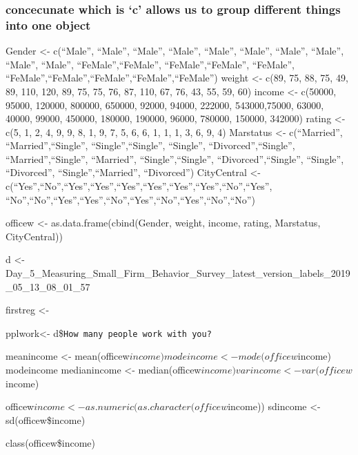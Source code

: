 \documentclass[
]{article}
\begin{document}
\hypertarget{concecunate-which-is-c-allows-us-to-group-different-things-into-one-object}{%
\subsubsection{concecunate which is `c' allows us to group different
things into one
object}\label{concecunate-which-is-c-allows-us-to-group-different-things-into-one-object}}

Gender \textless- c(``Male'', ``Male'', ``Male'', ``Male'', ``Male'',
``Male'', ``Male'', ``Male'', ``Male'', ``Male'', ``FeMale'',``FeMale'',
``FeMale'',``FeMale'', ``FeMale'',
``FeMale'',``FeMale'',``FeMale'',``FeMale'',``FeMale'') weight
\textless- c(89, 75, 88, 75, 49, 89, 110, 120, 89, 75, 75, 76, 87, 110,
67, 76, 43, 55, 59, 60) income \textless- c(50000, 95000, 120000,
800000, 650000, 92000, 94000, 222000, 543000,75000, 63000, 40000, 99000,
450000, 180000, 190000, 96000, 780000, 150000, 342000) rating \textless-
c(5, 1, 2, 4, 9, 9, 8, 1, 9, 7, 5, 6, 6, 1, 1, 1, 3, 6, 9, 4) Marstatus
\textless- c(``Married'', ``Married'',``Single'', ``Single'',``Single'',
``Single'', ``Divorced'',``Single'', ``Married'',``Single'',
``Married'', ``Single'',``Single'', ``Divorced'',``Single'', ``Single'',
``Divorced'', ``Single'',``Married'', ``Divorced'') CityCentral
\textless-
c(``Yes'',``No'',``Yes'',``Yes'',``Yes'',``Yes'',``Yes'',``Yes'',``No'',``Yes'',
``No'',``No'',``Yes'',``Yes'',``No'',``Yes'',``No'',``Yes'',``No'',``No'')

officew \textless- as.data.frame(cbind(Gender, weight, income, rating,
Marstatus, CityCentral))

d \textless-
Day\_5\_Measuring\_Small\_Firm\_Behavior\_Survey\_latest\_version\_labels\_2019\_05\_13\_08\_01\_57

firstreg \textless-

pplwork\textless- d\$\texttt{How\ many\ people\ work\ with\ you?}

meanincome \textless-
mean(officew\(income) modeincome <- mode(officew\)income) modeincome
medianincome \textless-
median(officew\(income) varincome <- var(officew\)income)

officew\(income <- as.numeric(as.character(officew\)income)) sdincome
\textless- sd(officew\$income)

class(officew\$income)

\hypertarget{section}{%
\section{}\label{section}}
\end{document}
